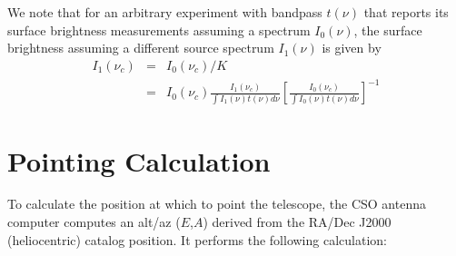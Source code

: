 \documentclass[12pt,preprint]{aastex}
\begin{document}
%
We note that for an arbitrary experiment with bandpass $t(\nu)$ that
reports its surface brightness measurements assuming a spectrum
$I_0(\nu)$, the surface brightness assuming a different source
spectrum $I_1(\nu)$ is given by
\begin{eqnarray}
I_1(\nu_c) &=& I_0(\nu_c) / K \\
\nonumber &=& I_0(\nu_c) \frac{I_1(\nu_c)}{\int I_1(\nu) t(\nu) d \nu} \left[\frac{I_0(\nu_c)}{\int I_0(\nu) t(\nu) d \nu} \right]^{-1}
\end{eqnarray}


\section{Pointing Calculation}
\label{app:PointingCalculation}

To calculate the position at which to point the telescope, the CSO
antenna computer computes an alt/az ($E$,$A$) derived from the RA/Dec J2000
(heliocentric) catalog position.  It performs the following
calculation:
\end{document}
